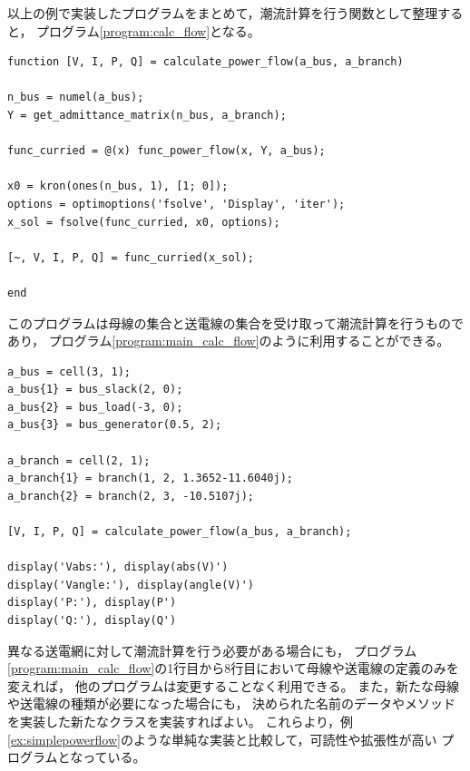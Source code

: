 \documentclass[tombow,dvipdfmx]{corona-a5-1.1}
\begin{document}
\begin{例}[潮流計算の実装結果]
以上の例で実装したプログラムをまとめて，潮流計算を行う関数として整理すると，
プログラム\nobreak\ref{program:calc_flow}となる。

\smallskip
\begin{PROGRAMA}[count,title={calculate\_power\_flow.m}]\label{program:calc_flow}
\begin{verbatim}
function [V, I, P, Q] = calculate_power_flow(a_bus, a_branch)

n_bus = numel(a_bus);
Y = get_admittance_matrix(n_bus, a_branch);

func_curried = @(x) func_power_flow(x, Y, a_bus);

x0 = kron(ones(n_bus, 1), [1; 0]);
options = optimoptions('fsolve', 'Display', 'iter');
x_sol = fsolve(func_curried, x0, options);

[~, V, I, P, Q] = func_curried(x_sol);

end
\end{verbatim}
\end{PROGRAMA}

このプログラムは母線の集合と送電線の集合を受け取って潮流計算を行うものであり，
プログラム\nobreak\ref{program:main_calc_flow}のように利用することができる。

\smallskip
\begin{PROGRAMA}[count,title={main\_power\_flow.m}]\label{program:main_calc_flow}
\begin{verbatim}
a_bus = cell(3, 1);
a_bus{1} = bus_slack(2, 0);
a_bus{2} = bus_load(-3, 0);
a_bus{3} = bus_generator(0.5, 2);

a_branch = cell(2, 1);
a_branch{1} = branch(1, 2, 1.3652-11.6040j);
a_branch{2} = branch(2, 3, -10.5107j);

[V, I, P, Q] = calculate_power_flow(a_bus, a_branch);

display('Vabs:'), display(abs(V)')
display('Vangle:'), display(angle(V)')
display('P:'), display(P')
display('Q:'), display(Q')
\end{verbatim}
\end{PROGRAMA}

異なる送電網に対して潮流計算を行う必要がある場合にも，
プログラム\nobreak\ref{program:main_calc_flow}の1行目から8行目において母線や送電線の定義のみを変えれば，
他のプログラムは変更することなく利用できる。
また，新たな母線や送電線の種類が必要になった場合にも，
決められた名前のデータやメソッドを実装した新たなクラスを実装すればよい。
これらより，例\ref{ex:simplepowerflow}のような単純な実装と比較して，可読性や拡張性が高い
プログラムとなっている。
\end{例}
\end{document}
